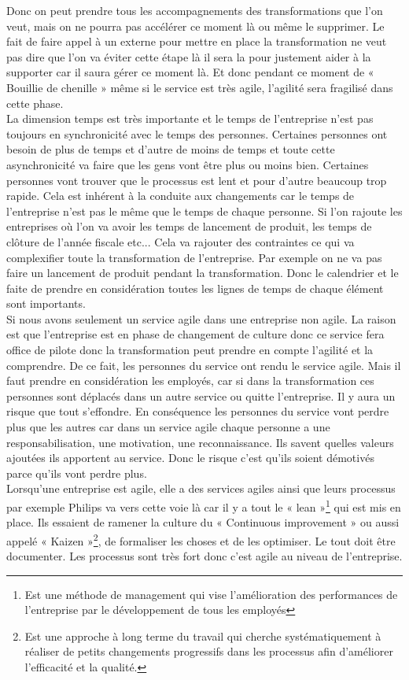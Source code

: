 \documentclass[12pt,a4paper]{article}
\begin{document}
Donc on peut prendre tous les accompagnements des transformations que l'on veut, mais on ne pourra pas accélérer ce moment là ou même le supprimer. Le fait de faire appel à un externe pour mettre en place la transformation ne veut pas dire que l'on va éviter cette étape là il sera la pour justement aider à la supporter car il saura gérer ce moment là.
Et donc pendant ce moment de « Bouillie de chenille » même si le service est très agile, l'agilité sera fragilisé dans cette phase.\\

La dimension temps est très importante et le temps de l'entreprise n'est pas toujours en synchronicité avec le temps des personnes. Certaines personnes ont besoin de plus de temps et d'autre de moins de temps et toute cette asynchronicité va faire que les gens vont être plus ou moins bien. Certaines personnes vont trouver que le processus est lent et pour d'autre beaucoup trop rapide. Cela est inhérent à la conduite aux changements car le temps de l'entreprise n'est pas le même que le temps de chaque personne. Si l'on rajoute les entreprises où l'on va avoir les temps de lancement de produit, les temps de clôture de l'année fiscale etc... Cela va rajouter des contraintes ce qui va complexifier toute la transformation de l'entreprise. Par exemple on ne va pas faire un lancement de produit pendant la transformation. Donc le calendrier et le faite de prendre en considération toutes les lignes de temps de chaque élément sont importants.\\

Si nous avons seulement un service agile dans une entreprise non agile. La raison est que l'entreprise est en phase de changement de culture donc ce service fera office de pilote donc la transformation peut prendre en compte l'agilité et la comprendre. De ce fait, les personnes du service ont rendu le service agile. Mais il faut prendre en considération les employés, car si dans la transformation ces personnes sont déplacés dans un autre service ou quitte l'entreprise. Il y aura un risque que tout s'effondre. En conséquence les personnes du service vont perdre plus que les autres car dans un service agile chaque personne a une responsabilisation, une motivation, une reconnaissance. Ils savent quelles valeurs ajoutées ils apportent au service. Donc le risque c'est qu'ils soient démotivés parce qu'ils vont perdre plus.\\
Lorsqu'une entreprise est agile, elle a des services agiles ainsi que leurs processus par exemple Philips va vers cette voie là car il y a tout le « lean »\footnote{Est une méthode de management qui vise l’amélioration des performances de l’entreprise par le développement de tous les employés} qui est mis en place. Ils essaient de ramener la culture du « Continuous improvement » ou aussi appelé « Kaizen »\footnote{Est une approche à long terme du travail qui cherche systématiquement à réaliser de petits changements progressifs dans les processus afin d'améliorer l'efficacité et la qualité.}, de formaliser les choses et de les optimiser. Le tout doit être documenter. Les processus sont très fort donc c'est agile au niveau de l'entreprise.\\
\end{document}
